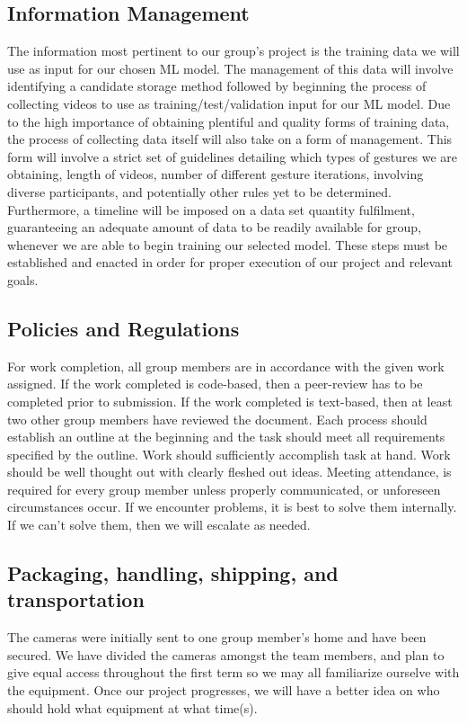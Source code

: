 \documentclass[onecolumn, draftclsnofoot,10pt, compsoc]{IEEEtran}
\begin{document}
\subsection{Information Management}
The information most pertinent to our group’s project is the training data we will use as input for our chosen ML model. The management of this data will involve identifying a candidate storage method followed by beginning the process of collecting videos to use as training/test/validation input for our ML model. Due to the high importance of obtaining plentiful and quality forms of training data, the process of collecting data itself will also take on a form of management. This form will involve a strict set of guidelines detailing which types of gestures we are obtaining, length of videos, number of different gesture iterations, involving diverse participants, and potentially other rules yet to be determined. Furthermore, a timeline will be imposed on a data set quantity fulfilment, guaranteeing an adequate amount of data to be readily available for group, whenever we are able to begin training our selected model. These steps must be established and enacted in order for proper execution of our project and relevant goals. 
\subsection{Policies and Regulations}
For work completion, all group members are in accordance  with the given work assigned. If the work completed is code-based, then a peer-review has to be completed prior to submission. If the work completed is text-based, then at least two other group members have reviewed the document. Each process should establish an outline at the beginning and the task should meet all requirements specified by the outline. Work should sufficiently accomplish task at hand. Work should be well thought out with clearly fleshed out ideas. Meeting attendance, is required for every group  member unless properly communicated, or unforeseen circumstances occur. If we encounter problems, it is best to solve them internally. If we can't solve them, then we will escalate as needed.
\subsection{Packaging, handling, shipping, and transportation}
The cameras were initially sent to one group member's home and have been secured. We have divided the cameras amongst the team members, and plan to give equal access throughout the first term so we may all familiarize ourselve with the equipment. Once our project progresses, we will have a better idea on who should hold what equipment at what time(s).
\end{document}
